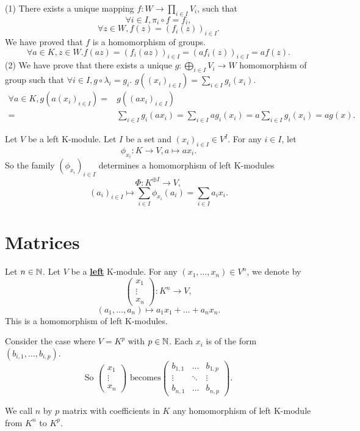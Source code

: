 \documentclass{book}
\numberwithin{equation}{section}
\begin{document}
\begin{proofenv}
    \quad
    \newline
    (1) There exists a unique mapping $f:W\rightarrow \prod_{i\in I}V_i$, such that 
    $$\forall i\in I,\pi_i\circ f=f_i,$$
    $$\forall z\in W,f(z)=(f_i(z))_{i\in I}.$$
    We have proved that $f$ is a homomorphism of groups.
    $$\forall a\in K,z\in W. f(az)=(f_i(az))_{i\in I}=(af_i(z))_{i\in I}=af(z).$$
    (2) We have prove that there exists a unique $g:\bigoplus_{i\in I}V_i\rightarrow W$ homomorphism of group such that $\forall i\in I, g\circ \lambda_i=g_i.$ $g\left((x_i)_{i\in I}\right)=\sum_{i\in I}g_i(x_i)$.
    \begin{align*}
        \forall a\in K,g\left(a(x_i)_{i\in I}\right)=&g\left((ax_i)_{i\in I}\right)\\
        =&\sum_{i\in I}g_i(ax_i)=\sum_{i\in I}ag_i(x_i)
        =a\sum_{i\in I}g_i(x_i)=ag(x).
    \end{align*}
\end{proofenv}
\begin{applicationenv}
Let $V$ be a left K-module. Let $I$ be a set and $(x_i)_{i\in I}\in V^{I}$. For any $i\in I$, let 
$$\phi_{x_i}:K\longrightarrow V,a\mapsto ax_i.$$ 
So the family $(\phi_{x_i})_{i\in I}$ determines a homomorphism of left K-modules 
$$\Phi:K^{\oplus I}\longrightarrow V,$$
$$(a_i)_{i\in I}\longmapsto \sum_{i\in I}\phi_{x_i}(a_i)=\sum_{i\in I}a_ix_i.$$
\end{applicationenv}

\section{Matrices}
\begin{definitionenv}
    Let $n\in \mathbb{N}$. Let $V$ be a \underline{\textbf{left}} K-module. For any $(x_1,\dots,x_n)\in V^n$, we denote by 
    $$\begin{pmatrix}
x_1 \\
 \vdots \\
x_n
\end{pmatrix}
:
K^n\longrightarrow V,$$
$$(a_1,\dots,a_n)\longmapsto a_1x_1+\dots+a_nx_n. $$
This is a homomorphism of left K-modules.
\end{definitionenv}
\begin{exampleenv}
    Consider the case where $V=K^p$ with $p\in \mathbb{N}$. Each $x_i$ is of the form $(b_{i,1},\dots,b_{i,p})$.
    $$\text{So } \begin{pmatrix}
x_1 \\
 \vdots \\
x_n
\end{pmatrix}
\text{ becomes}
\begin{pmatrix}
  b_{1,1}& \dots  &b_{1,p} \\
  \vdots & \ddots  & \vdots \\
  b_{n,1}& \dots &b_{n,p}
\end{pmatrix} .$$
\end{exampleenv}
\begin{definitionenv}
    We call $n$ by $p$ matrix with coefficients in $K$ any homomorphism of left K-module from $K^n$ to $K^p$.
\end{definitionenv}
\end{document}
